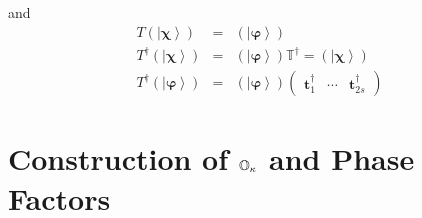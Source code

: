 \documentclass[aps,preprint]{revtex4}
\begin{document}
and 
\begin{eqnarray}
T\left( \left\vert \mathbf{\chi }\right\rangle \right) &=&\left( \left\vert 
\mathbf{\varphi }\right\rangle \right)  \nonumber \\
T^{\dagger }\left( \left\vert \mathbf{\chi }\right\rangle \right) &=&\left(
\left\vert \mathbf{\varphi }\right\rangle \right) \mathbb{T}^{\dagger
}=\left( \left\vert \mathbf{\chi }\right\rangle \right)  \nonumber \\
T^{\dagger }\left( \left\vert \mathbf{\varphi }\right\rangle \right)
&=&\left( \left\vert \mathbf{\varphi }\right\rangle \right) \left( 
\begin{array}{ccc}
\mathbf{t}_{1}^{\dagger } & \cdots & \mathbf{t}_{2s}^{\dagger }%
\end{array}%
\right)
\end{eqnarray}

\section{Construction of $\mathbb{O}_{\protect\kappa }$ and Phase Factors}
\end{document}
